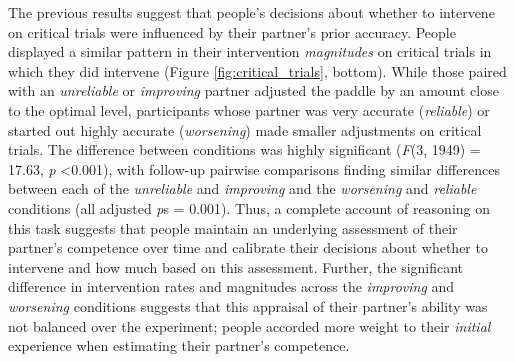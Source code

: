\documentclass[10pt,letterpaper]{article}
\begin{document}
The previous results suggest that people's decisions about whether to intervene on critical trials were influenced by their partner's prior accuracy. People displayed a similar pattern in their intervention \textit{magnitudes} on critical trials in which they did intervene (Figure \ref{fig:critical_trials}, bottom). While those paired with an \textit{unreliable} or \textit{improving} partner adjusted the paddle by an amount close to the optimal level, participants whose partner was very accurate (\textit{reliable}) or started out highly accurate (\textit{worsening}) made smaller adjustments on critical trials. The difference between conditions was highly significant (\textit{F}(3, 1949) = 17.63, \textit{p} \textless{0.001}), with follow-up pairwise comparisons finding similar differences between each of the \textit{unreliable} and \textit{improving} and the \textit{worsening} and \textit{reliable} conditions (all adjusted \textit{p}s = 0.001). Thus, a complete account of reasoning on this task suggests that people maintain an underlying assessment of their partner's competence over time and calibrate their decisions about whether to intervene and how much based on this assessment. Further, the significant difference in intervention rates and magnitudes across the \textit{improving} and \textit{worsening} conditions suggests that this appraisal of their partner's ability was not balanced over the experiment; people accorded more weight to their \textit{initial} experience when estimating their partner's competence.



\end{document}
